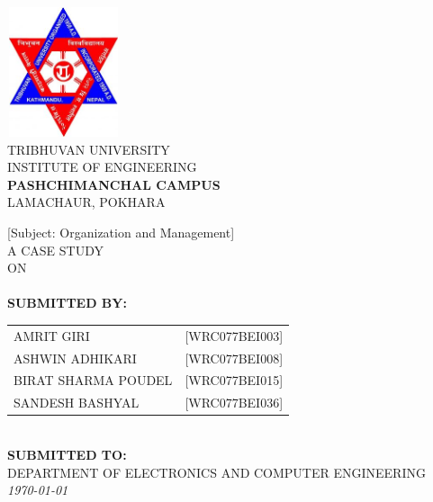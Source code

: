 \begin{titlingpage} 
    \begin{normalsize}
    \begin{center}
    \includegraphics[width=1.3in, height=1.5in]{./Graphics/logotu.jpg}\\
    \vspace{0.5cm}
    \MakeUppercase{TRIBHUVAN UNIVERSITY}\\
    \MakeUppercase{INSTITUTE OF ENGINEERING}\\
    {\fontsize{16pt}{18pt}\selectfont
    \textbf{\MakeUppercase PASHCHIMANCHAL CAMPUS}}\\
    \MakeUppercase{Lamachaur, Pokhara}
    \end{center}
    \vspace{0.5cm}
    
    \begin{center}
    [Subject: Organization and Management]\\ A CASE STUDY\\ON\\
    \textbf{\MakeUppercase \thetitle} \\
    \vspace{1.5 cm}
    \textbf{SUBMITTED BY:}\\
\begin{tabular}{p{5cm} l}
    \MakeUppercase{Amrit Giri} & \MakeUppercase{[WRC077BEI003]}\\
    \MakeUppercase{Ashwin Adhikari} & \MakeUppercase{[WRC077BEI008]}\\
    \MakeUppercase{Birat Sharma Poudel} & \MakeUppercase{[WRC077BEI015]}\\
    \MakeUppercase{Sandesh Bashyal} & \MakeUppercase{[WRC077BEI036]}
\end{tabular}\\
    \vspace{2 cm}
    \textbf{SUBMITTED TO:}\\
    \MakeUppercase{DEPARTMENT OF ELECTRONICS AND COMPUTER ENGINEERING}\\
    \vspace{1.5cm}
    \textit{{\monthyeardate\today}}
    \end{center}
    \end{normalsize}
    \end{titlingpage}
    \newpage